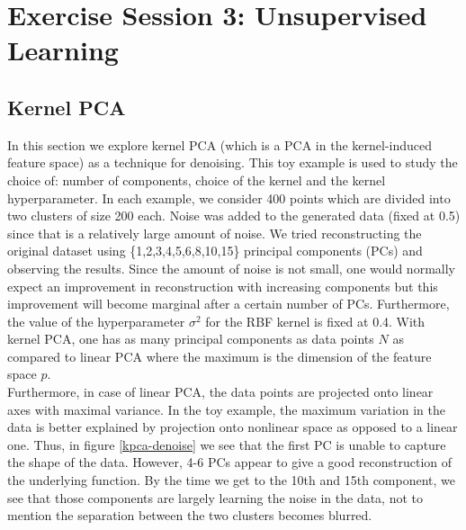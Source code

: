 \documentclass[paper=a4, fontsize=11pt]{scrartcl} %
\numberwithin{equation}{section} %
\begin{document}
\section{Exercise Session 3: Unsupervised Learning}

\subsection{Kernel PCA}

In this section we explore kernel PCA (which is a PCA in the kernel-induced feature space) as a technique for denoising. This toy example is used to study the choice of: number of components, choice of the kernel and the kernel hyperparameter. In each example, we consider 400 points which are divided into two clusters of size 200 each. Noise was added to the generated data (fixed at 0.5) since that is a relatively large amount of noise. We tried reconstructing the original dataset using \{1,2,3,4,5,6,8,10,15\} principal components (PCs) and observing the results. Since the amount of noise is not small, one would normally expect an improvement in reconstruction with increasing components but this improvement will become marginal after a certain number of PCs. Furthermore, the value of the hyperparameter $\sigma^2$ for the RBF kernel is fixed at 0.4. With kernel PCA, one has as many principal components as data points $N$ as compared to linear PCA where the maximum is the dimension of the feature space $p$.\\

Furthermore, in case of linear PCA, the data points are projected onto linear axes with maximal variance. In the toy example, the maximum variation in the data is better explained by projection onto nonlinear space as opposed to a linear one. Thus, in figure \ref{kpca-denoise} we see that the first PC is unable to capture the shape of the data. However, 4-6 PCs appear to give a good reconstruction of the underlying function. By the time we get to the 10th and 15th component, we see that those components are largely learning the noise in the data, not to mention the separation between the two clusters becomes blurred.
\end{document}
